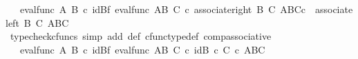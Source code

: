 \begin{isabellebody}
\ {\isachardoublequoteopen}{\isachardot}{\kern0pt}{\isachardot}{\kern0pt}{\isachardot}{\kern0pt}\ {\isacharequal}{\kern0pt}\ {\isacharparenleft}{\kern0pt}{\isacharparenleft}{\kern0pt}eval{\isacharunderscore}{\kern0pt}func\ A\ B{\isacharparenright}{\kern0pt}\ {\isasymcirc}\isactrlsub c\ {\isacharparenleft}{\kern0pt}id{\isacharparenleft}{\kern0pt}B{\isacharparenright}{\kern0pt}{\isasymtimes}\isactrlsub f\ eval{\isacharunderscore}{\kern0pt}func\ {\isacharparenleft}{\kern0pt}A\isactrlbsup B\isactrlesup {\isacharparenright}{\kern0pt}\ C{\isacharparenright}{\kern0pt}{\isacharparenright}{\kern0pt}\ {\isasymcirc}\isactrlsub c\ {\isacharparenleft}{\kern0pt}{\isacharparenleft}{\kern0pt}associate{\isacharunderscore}{\kern0pt}right\ B\ C\ {\isacharparenleft}{\kern0pt}{\isacharparenleft}{\kern0pt}A\isactrlbsup B\isactrlesup {\isacharparenright}{\kern0pt}\isactrlbsup C\isactrlesup {\isacharparenright}{\kern0pt}{\isacharparenright}{\kern0pt}{\isasymcirc}\isactrlsub c\ \ associate{\isacharunderscore}{\kern0pt}left\ B\ C\ {\isacharparenleft}{\kern0pt}{\isacharparenleft}{\kern0pt}A\isactrlbsup B\isactrlesup {\isacharparenright}{\kern0pt}\isactrlbsup C\isactrlesup {\isacharparenright}{\kern0pt}{\isacharparenright}{\kern0pt}{\isachardoublequoteclose}\isanewline
\ \ \ \ \ \ \ \ \ \ \isamarkupfalse%
\ {\isacharparenleft}{\kern0pt}typecheck{\isacharunderscore}{\kern0pt}cfuncs{\isacharcomma}{\kern0pt}\ simp\ add{\isacharcolon}{\kern0pt}\ {\isasympsi}{\isacharunderscore}{\kern0pt}def\ cfunc{\isacharunderscore}{\kern0pt}type{\isacharunderscore}{\kern0pt}def\ comp{\isacharunderscore}{\kern0pt}associative{\isacharparenright}{\kern0pt}\isanewline
\ \ \ \ \ \ \ \ \isamarkupfalse%
\ \isamarkupfalse%
\ {\isachardoublequoteopen}{\isachardot}{\kern0pt}{\isachardot}{\kern0pt}{\isachardot}{\kern0pt}\ {\isacharequal}{\kern0pt}\ {\isacharparenleft}{\kern0pt}{\isacharparenleft}{\kern0pt}eval{\isacharunderscore}{\kern0pt}func\ A\ B{\isacharparenright}{\kern0pt}\ {\isasymcirc}\isactrlsub c\ {\isacharparenleft}{\kern0pt}id{\isacharparenleft}{\kern0pt}B{\isacharparenright}{\kern0pt}{\isasymtimes}\isactrlsub f\ eval{\isacharunderscore}{\kern0pt}func\ {\isacharparenleft}{\kern0pt}A\isactrlbsup B\isactrlesup {\isacharparenright}{\kern0pt}\ C{\isacharparenright}{\kern0pt}{\isacharparenright}{\kern0pt}\ {\isasymcirc}\isactrlsub c\ id{\isacharparenleft}{\kern0pt}B\ {\isasymtimes}\isactrlsub c\ {\isacharparenleft}{\kern0pt}C\ {\isasymtimes}\isactrlsub c\ {\isacharparenleft}{\kern0pt}{\isacharparenleft}{\kern0pt}A\isactrlbsup B\isactrlesup {\isacharparenright}{\kern0pt}\isactrlbsup C\isactrlesup {\isacharparenright}{\kern0pt}{\isacharparenright}{\kern0pt}{\isacharparenright}{\kern0pt}{\isachardoublequoteclose}\isanewline

\end{isabellebody}
